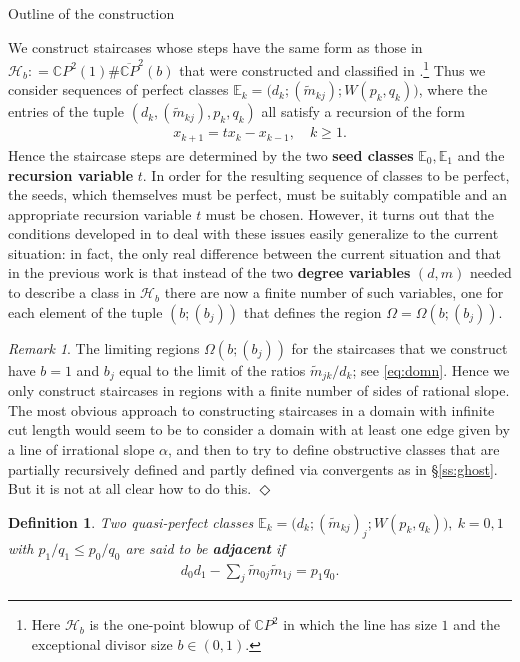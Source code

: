 \documentclass[11pt, reqno]{amsart}
\makeatletter
\def\subsection{\@startsection{subsection}{2}%
  \z@{.75\linespacing\@plus.7\linespacing}{-.5em}%
  {\normalfont\large\bfseries}}
\newtheorem{definition}[thm]{Definition}
\theoremstyle{remark}
\numberwithin{equation}{subsection}
\numberwithin{figure}{section}
\theoremstyle{customremark}
\newtheorem{rmk_no_diamond}[thm]{Remark}
\newenvironment{rmk}{\begin{rmk_no_diamond} } {\hfill$\er$ \end{rmk_no_diamond}}
\newcommand{\Tm}{{\widetilde m}}
\newcommand{\Hh}{{\mathcal H}}
\newcommand{\bE}{{\mathbb E}}
\newcommand{\ov}{\overline}
\newcommand{\al}{{\alpha}}
\newcommand{\Om}{{\Omega}}
\newcommand{\er}{{\Diamond}}
\newcommand{\C}{\mathbb{C}}
\makeatother
\begin{document}
\subsection{Outline of the construction}

We construct  staircases whose steps  have the same form as those in $\Hh_b: = \C P^2(1)\# \ov{\C P}^2(b)$ that were constructed and classified in \cite{BHM,MM,MMW}.\footnote
{
Here $\Hh_b$ is  the one-point blowup of $\C P^2$ in which the line has size $1$ and the exceptional divisor size $b\in (0,1)$.}
  Thus we consider sequences of perfect classes $\bE_k = \bigl(d_k; (\Tm_{kj}); W(p_k,q_k)\bigr)$, where the entries of the tuple $(d_k, (\Tm_{kj}), p_k, q_k)$ all satisfy a recursion of the form
\begin{align}\label{eq:recur} 
x_{k+1} = t x_k - x_{k-1},\quad k\ge 1.
\end{align}
Hence the staircase steps are determined by the two {\bf seed classes} $\bE_0, \bE_1$ and the {\bf recursion variable} $t$. 
In order for the resulting sequence of classes to be perfect,  the seeds, which themselves must be perfect, must be suitably compatible and an appropriate recursion variable $t$ must be chosen.  However, it turns out that the conditions developed in
\cite{MM,MMW} to deal with these issues easily generalize to the current situation: in fact, the only real difference between the current situation and that in the previous work is that instead of the two {\bf degree variables} $(d,m)$  needed to describe a class in $\Hh_b$ there are now a finite number of such variables, one for each element of the tuple $(b; (b_j))$ that defines the region $\Om = \Om(b; (b_j))$.


\begin{rmk}\rm The limiting regions $\Om(b;(b_j))$ for the staircases that we construct  have $b=1$ and $b_j$ equal to the limit of the ratios $\Tm_{jk}/d_k$; see \eqref{eq:domn}.  Hence we only construct staircases in  regions with a finite number of sides of rational slope. The most obvious approach to constructing staircases in a domain with infinite cut length would seem to be to consider a domain with at least one edge given by a line of irrational slope $\al$, and then to try to define obstructive classes that are partially recursively defined and partly defined via convergents
as in \S\ref{ss:ghost}.
But it is not at all clear how to do this.  
\end{rmk} 

\begin{definition}\label{def:adj} Two quasi-perfect classes $\bE_k = \bigl(d_k; (\Tm_{kj})_j; W(p_k,q_k)\bigr),\ k=0,1$ with $p_1/q_1 \le p_0/q_0$ are said to be
{\bf adjacent} if 
\begin{align}\label{eq:adj} 
d_0d_1 - \sum_j \Tm_{0j}\Tm_{1j}  = p_1q_0.
\end{align}
\end{definition}
\end{document}
